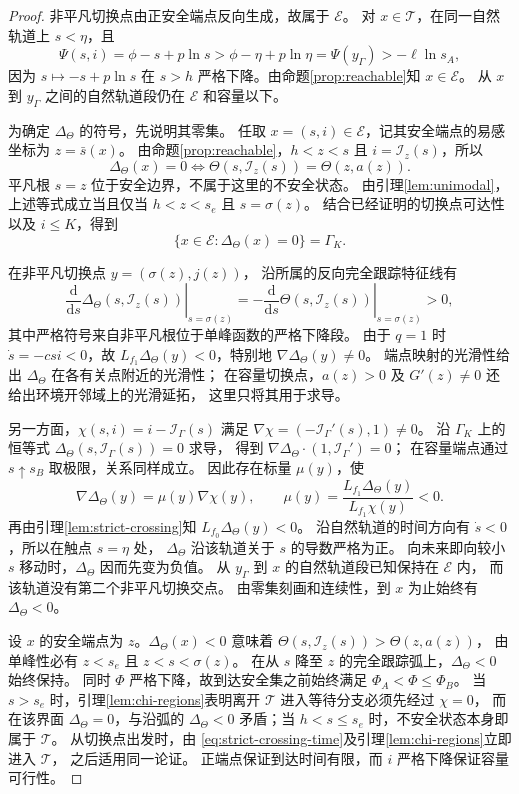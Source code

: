 \documentclass[11pt,a4paper,UTF8]{ctexart}
\theoremstyle{definition}
\begin{document}
\begin{proof}
非平凡切换点由正安全端点反向生成，故属于 $\mathcal E$。
对 $x\in\mathcal T$，在同一自然轨道上 $s<\eta$，且
\[
\Psi(s,i)=\phi-s+p\ln s>\phi-\eta+p\ln\eta=\Psi(y_\Gamma)>-\ell\ln s_A,
\]
因为 $s\mapsto-s+p\ln s$ 在 $s>h$ 严格下降。由命题\ref{prop:reachable}知 $x\in\mathcal E$。
从 $x$ 到 $y_\Gamma$ 之间的自然轨道段仍在 $\mathcal E$ 和容量以下。

为确定 $\Delta_\Theta$ 的符号，先说明其零集。
任取 $x=(s,i)\in\mathcal E$，记其安全端点的易感坐标为 $z=\bar s(x)$。
由命题\ref{prop:reachable}，$h<z<s$ 且 $i=\mathcal I_z(s)$，所以
\[
\Delta_\Theta(x)=0
\iff \Theta(s,\mathcal I_z(s))=\Theta(z,a(z)).
\]
平凡根 $s=z$ 位于安全边界，不属于这里的不安全状态。
由引理\ref{lem:unimodal}，上述等式成立当且仅当
$h<z<s_e$ 且 $s=\sigma(z)$。
结合已经证明的切换点可达性以及 $i\le K$，得到
\[
\{x\in\mathcal E:\Delta_\Theta(x)=0\}=\Gamma_K.
\]

在非平凡切换点 $y=(\sigma(z),j(z))$，
沿所属的反向完全跟踪特征线有
\[
\left.\frac{\mathrm d}{\mathrm d s}\Delta_\Theta(s,\mathcal I_z(s))\right|_{s=\sigma(z)}
=-\left.\frac{\mathrm d}{\mathrm d s}\Theta(s,\mathcal I_z(s))\right|_{s=\sigma(z)}>0,
\]
其中严格符号来自非平凡根位于单峰函数的严格下降段。
由于 $q=1$ 时 $\dot s=-csi<0$，故 $L_{f_1}\Delta_\Theta(y)<0$，特别地
$\nabla \Delta_\Theta(y)\ne0$。
端点映射的光滑性给出 $\Delta_\Theta$ 在各有关点附近的光滑性；
在容量切换点，$a(z)>0$ 及 $G'(z)\ne0$ 还给出环境开邻域上的光滑延拓，
这里只将其用于求导。

另一方面，$\chi(s,i)=i-\mathcal I_\Gamma(s)$ 满足
$\nabla\chi=(-\mathcal I_\Gamma'(s),1)\ne0$。
沿 $\Gamma_K$ 上的恒等式 $\Delta_\Theta(s,\mathcal I_\Gamma(s))=0$ 求导，
得到 $\nabla \Delta_\Theta\cdot(1,\mathcal I_\Gamma')=0$；
在容量端点通过 $s\uparrow s_B$ 取极限，关系同样成立。
因此存在标量 $\mu(y)$，使
\[
\nabla \Delta_\Theta(y)=\mu(y)\nabla\chi(y),\qquad
\mu(y)=\frac{L_{f_1}\Delta_\Theta(y)}{L_{f_1}\chi(y)}<0.
\]
再由引理\ref{lem:strict-crossing}知 $L_{f_0}\Delta_\Theta(y)<0$。
沿自然轨道的时间方向有 $\dot s<0$，所以在触点 $s=\eta$ 处，
$\Delta_\Theta$ 沿该轨道关于 $s$ 的导数严格为正。
向未来即向较小 $s$ 移动时，$\Delta_\Theta$ 因而先变为负值。
从 $y_\Gamma$ 到 $x$ 的自然轨道段已知保持在 $\mathcal E$ 内，
而该轨道没有第二个非平凡切换交点。
由零集刻画和连续性，到 $x$ 为止始终有 $\Delta_\Theta<0$。

设 $x$ 的安全端点为 $z$。$\Delta_\Theta(x)<0$ 意味着 $\Theta(s,\mathcal I_z(s))>\Theta(z,a(z))$，
由单峰性必有 $z<s_e$ 且 $z<s<\sigma(z)$。
在从 $s$ 降至 $z$ 的完全跟踪弧上，$\Delta_\Theta<0$ 始终保持。
同时 $\Phi$ 严格下降，故到达安全集之前始终满足 $\Phi_A<\Phi\le\Phi_B$。
当 $s>s_e$ 时，引理\ref{lem:chi-regions}表明离开 $\mathcal T$ 进入等待分支必须先经过 $\chi=0$，
而在该界面 $\Delta_\Theta=0$，与沿弧的 $\Delta_\Theta<0$ 矛盾；当 $h<s\le s_e$ 时，不安全状态本身即属于 $\mathcal T$。
从切换点出发时，由 \eqref{eq:strict-crossing-time}及引理\ref{lem:chi-regions}立即进入 $\mathcal T$，
之后适用同一论证。
正端点保证到达时间有限，而 $i$ 严格下降保证容量可行性。
\end{proof}
\end{document}
